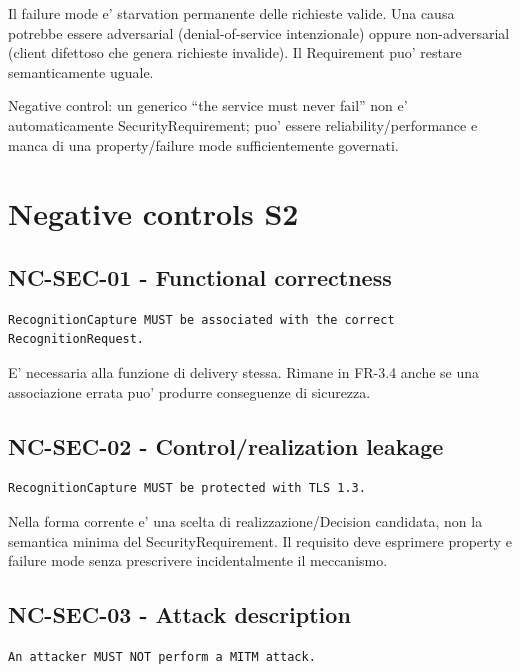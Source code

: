 \documentclass[11pt,a4paper]{article}
\begin{document}
Il failure mode e' starvation permanente delle richieste valide. Una causa potrebbe essere adversarial (denial-of-service intenzionale) oppure non-adversarial (client difettoso che genera richieste invalide). Il Requirement puo' restare semanticamente uguale.

Negative control: un generico ``the service must never fail'' non e' automaticamente SecurityRequirement; puo' essere reliability/performance e manca di una property/failure mode sufficientemente governati.

\section{Negative controls S2}

\subsection{NC-SEC-01 - Functional correctness}

\begin{lstlisting}
RecognitionCapture MUST be associated with the correct
RecognitionRequest.
\end{lstlisting}

E' necessaria alla funzione di delivery stessa. Rimane in FR-3.4 anche se una associazione errata puo' produrre conseguenze di sicurezza.

\subsection{NC-SEC-02 - Control/realization leakage}

\begin{lstlisting}
RecognitionCapture MUST be protected with TLS 1.3.
\end{lstlisting}

Nella forma corrente e' una scelta di realizzazione/Decision candidata, non la semantica minima del SecurityRequirement. Il requisito deve esprimere property e failure mode senza prescrivere incidentalmente il meccanismo.

\subsection{NC-SEC-03 - Attack description}

\begin{lstlisting}
An attacker MUST NOT perform a MITM attack.
\end{lstlisting}
\end{document}
